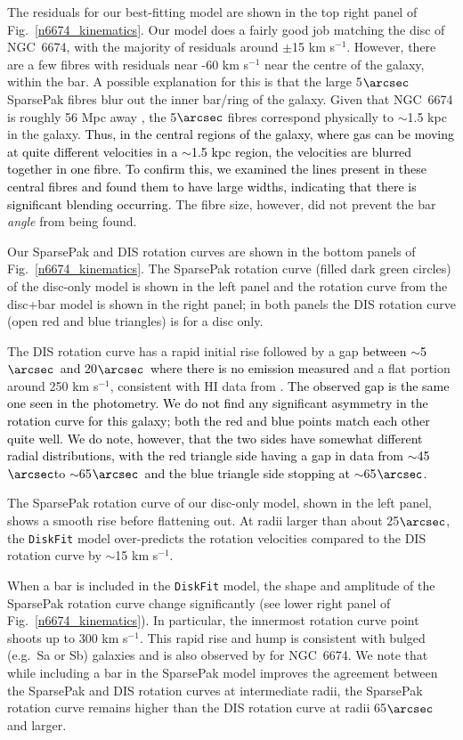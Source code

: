 \documentclass[a4paper,fleqn,usenatbib]{mnras}
\newcommand{\authorfix}{\textcolor{black}}
\begin{document}
The residuals for our best-fitting model are shown in the top right panel of Fig.~\ref{n6674_kinematics}. Our model does a fairly good job matching the disc of NGC~6674, with the majority of residuals around $\pm$15 km s$^{-1}$. However, there are a few fibres with residuals near -60 km s$^{-1}$ near the centre of the galaxy, within the bar. A possible explanation for this is that the large 5$\arcsec$ SparsePak fibres blur out the inner bar/ring of the galaxy. Given that NGC~6674 is roughly 56 Mpc away \citep{sorce2014}, the 5$\arcsec$ fibres correspond physically to $\sim$1.5 kpc in the galaxy. \authorfix{Thus, in the central regions of the galaxy, where gas can be moving at quite different velocities in a $\sim$1.5 kpc region, the velocities are blurred together in one fibre. To confirm this, we examined the lines present in these central fibres and found them to have large widths, indicating that there is significant blending occurring.} The fibre size, however, did not prevent the bar \textit{angle} from being found. 

Our SparsePak and DIS rotation curves are shown in the bottom panels of Fig.~\ref{n6674_kinematics}. The SparsePak rotation curve (filled dark green circles) of the disc-only model is shown in the left panel and the rotation curve from the disc+bar model is shown in the right panel; in both panels the DIS rotation curve (open red and blue triangles) is for a disc only. 

The DIS rotation curve has a rapid initial rise followed by a gap \authorfix{between $\sim$5$\arcsec$\ and 20$\arcsec$\ where there is no emission measured} and a flat portion around 250 km s$^{-1}$, consistent with HI data from \citet{combes2015}. \authorfix{The observed gap is the same one seen in the photometry. We do not find any significant asymmetry in the rotation curve for this galaxy; both the red and blue points match each other quite well. We do note, however, that the two sides have somewhat different radial distributions, with the red triangle side having a gap in data from $\sim$45$\arcsec$to $\sim$65$\arcsec$\ and the blue triangle side stopping at $\sim$65$\arcsec$.}

The SparsePak rotation curve of our disc-only model, shown in the left panel, shows a smooth rise before flattening out. At radii larger than about 25$\arcsec$, the \texttt{DiskFit} model over-predicts the rotation velocities compared to the DIS rotation curve by $\sim$15 km s$^{-1}$. 

When a bar is included in the \texttt{DiskFit} model, the shape and amplitude of the SparsePak rotation curve change significantly (see lower right panel of Fig.~\ref{n6674_kinematics}). In particular, the innermost rotation curve point shoots up to 300 km s$^{-1}$. This rapid rise and hump is consistent with bulged (e.g.\ Sa or Sb) galaxies \citep{sofue1999} and is also observed by \citet{brownstein2006} for NGC~6674. We note that while including a bar in the SparsePak model improves the agreement between the SparsePak and DIS rotation curves at intermediate radii, the SparsePak rotation curve remains higher than the DIS rotation curve at radii 65$\arcsec$ and larger. 
\end{document}
